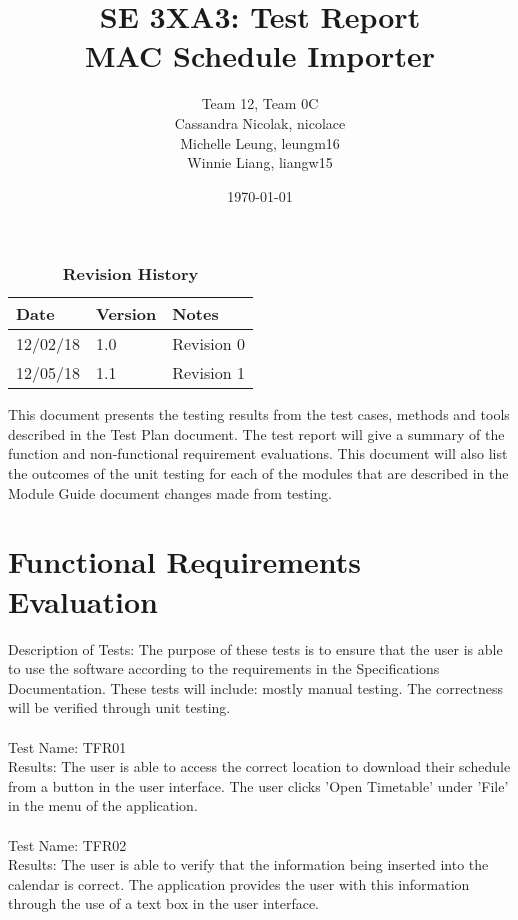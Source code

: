 \documentclass[12pt, titlepage]{article}
\title{SE 3XA3: Test Report\\MAC Schedule Importer}
\author{Team 12, Team 0C
		\\ Cassandra Nicolak, nicolace
		\\ Michelle Leung, leungm16
		\\ Winnie Liang, liangw15
}
\date{\today}
\begin{document}
\maketitle

\tableofcontents
\listoftables
\listoffigures

\begin{table}[bp]
\caption{\bf Revision History}
\begin{tabularx}{\textwidth}{p{3cm}p{2cm}X}
\toprule {\bf Date} & {\bf Version} & {\bf Notes}\\
\midrule
12/02/18 & 1.0 & Revision 0\\
12/05/18 & 1.1 & Revision 1\\
\bottomrule
\end{tabularx}
\end{table}
\FloatBarrier
\newpage


This document presents the testing results from the test cases, methods and tools described in the Test Plan document. The test report will give a summary of the function and non-functional requirement evaluations. This document will also list the outcomes of the unit testing for each of the modules that are described in the Module Guide document changes made from testing.

\section{Functional Requirements Evaluation}
	Description of Tests: The purpose of these tests is to ensure that the user is able to use the software according to the requirements in the Specifications Documentation. These tests will include: mostly manual testing. The correctness will be verified through unit testing. \\ \\
	
	Test Name: TFR01 \\
	
	Results: The user is able to access the correct location to download their schedule from a button in the user interface. The user clicks 'Open Timetable' under 'File' in the menu of the application. \\ \\
	
	Test Name: TFR02 \\
	
	Results: The user is able to verify that the information being inserted into the calendar is correct. The application provides the user with this information through the use of a text box in the user interface. \\ \\
	
\end{document}
